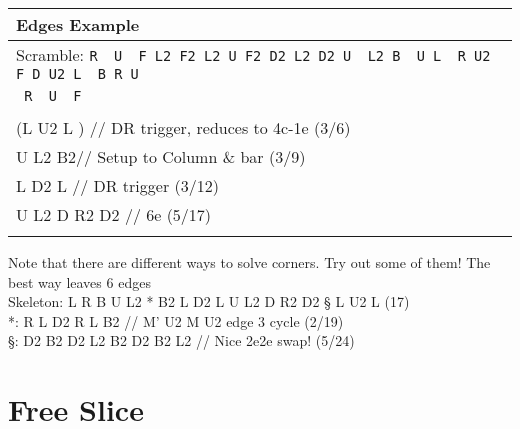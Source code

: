 \documentclass[11pt,a4paper]{book}
\newcommand{\p}{\textquotesingle}
\newcommand{\m}{\texttt}
\newcommand{\ps}{\p\,\,}
\newcommand{\comment}[1]{{\color{gray}\quad//#1}}
\begin{document}
\bigskip
\begin{tabular}{|l|}
\hline
\textbf{Edges Example}\\
\hline
Scramble: \m{R\ps U\ps F L2 F2 L2 U F2 D2 L2 D2 U\ps L2 B\ps U L\ps R U2 F D U2 L\ps B R U\ps}\\ \m{ R\ps U\ps F }\\
\hline
\begin{minipage}[l]{0.650\textwidth}
\bigskip
\m{L\ps R B \comment{ EO (3/3)}\\
(L\ps U2 L\ps) \comment{ DR trigger, reduces to 4c-1e (3/6)}\\
U L2 B2\comment{ Setup to Column \& bar (3/9)}\\
L D2 L\ps \comment{ DR trigger (3/12)}\\
U\ps L2 D R2 D2 \comment{ 6e (5/17)}\\
}
\bigskip
\end{minipage}
\begin{minipage}[c]{0.25\textwidth}
\centering
\def\svgwidth{\columnwidth}

\end{minipage}\\
\hline
\end{tabular}
\bigskip
\newline
Note that there are different ways to solve corners. Try out some of them! The best way leaves 6 edges\\
\newline
Skeleton: L\ps R B U L2 * B2 L D2 L\ps U\ps L2 D R2 D2 § L U2 L (17)\\
\newline
*: R L\ps D2 R\ps L B2 \comment{ M’ U2 M U2 edge 3 cycle (2/19) }\\
§: D2 B2 D2 L2 B2 D2 B2 L2 \comment{ Nice 2e2e swap! (5/24) }\\
\newpage
\section{Free Slice}
\end{document}
